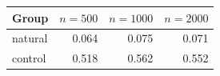 \begin{tabular}{lrrr}
\hline
Group & $n=500$ & $n=1000$ & $n=2000$ \\
\hline
natural & 0.064 & 0.075 & 0.071 \\
control & 0.518 & 0.562 & 0.552 \\
\hline
\end{tabular}
